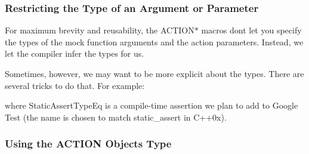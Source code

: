 \subsubsection*{Restricting the Type of an Argument or Parameter}

For maximum brevity and reusability, the {\ttfamily A\+C\+T\+I\+O\+N$\ast$} macros don\textquotesingle{}t let you specify the types of the mock function arguments and the action parameters. Instead, we let the compiler infer the types for us.

Sometimes, however, we may want to be more explicit about the types. There are several tricks to do that. For example\+: 
\begin{DoxyCode}{0}
\DoxyCodeLine{  \textcolor{comment}{// Makes sure arg0 can be converted to int.}}
\DoxyCodeLine{\}}
\DoxyCodeLine{}
\DoxyCodeLine{  \textcolor{comment}{// Makes sure the type of arg1 is const char*.}}
\DoxyCodeLine{}
\DoxyCodeLine{  \textcolor{comment}{// Makes sure param can be converted to bool.}}
\DoxyCodeLine{\}}
\end{DoxyCode}
 where {\ttfamily Static\+Assert\+Type\+Eq} is a compile-\/time assertion we plan to add to Google Test (the name is chosen to match {\ttfamily static\+\_\+assert} in C++0x).

\subsubsection*{Using the A\+C\+T\+I\+ON Object\textquotesingle{}s Type}

